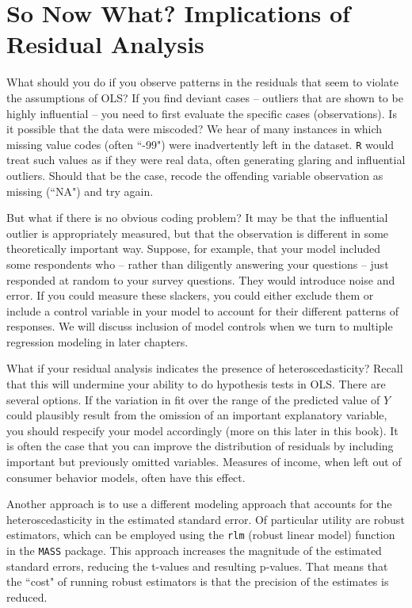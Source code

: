 \documentclass[11pt,openany]{book}\usepackage[]{graphicx}\usepackage[]{color}
\begin{document}
\section{So Now What? Implications of Residual Analysis}

What should you do if you observe patterns in the residuals that seem to violate the assumptions of OLS? If you find deviant cases -- outliers that are shown to be highly influential -- you need to first evaluate the specific cases (observations). Is it possible that the data were miscoded? We hear of many instances in which missing value codes (often ``-99") were inadvertently left in the dataset. \texttt{R} would treat such values as if they were real data, often generating glaring and influential outliers. Should that be the case, recode the offending variable observation as missing (``NA") and try again.  


But what if there is no obvious coding problem? It may be that the influential outlier is appropriately measured, but that the observation is different in some theoretically important way. Suppose, for example, that your model included some respondents who -- rather than diligently answering your questions -- just responded at random to your survey questions. They would introduce noise and error. If you could measure these slackers, you could either exclude them or include a control variable in your model to account for their different patterns of responses. We will discuss inclusion of model controls when we turn to multiple regression modeling in later chapters.

What if your residual analysis indicates the presence of heteroscedasticity? Recall that this will undermine your ability to do hypothesis tests in OLS. There are several options. If the variation in fit over the range of the predicted value of $Y$ could plausibly result from the omission of an important explanatory variable, you should respecify your model accordingly (more on this later in this book). It is often the case that you can improve the distribution of residuals by including important but previously omitted variables. Measures of income, when left out of consumer behavior models, often have this effect.

Another approach is to use a different modeling approach that accounts for the heteroscedasticity in the estimated standard error. Of particular utility are robust estimators, which can be employed using the \texttt{rlm} (robust linear model) function in the \texttt{MASS} package. This approach increases the magnitude of the estimated standard errors, reducing the t-values and resulting p-values. That means that the ``cost" of running robust estimators is that the precision of the estimates is reduced.
\end{document}
